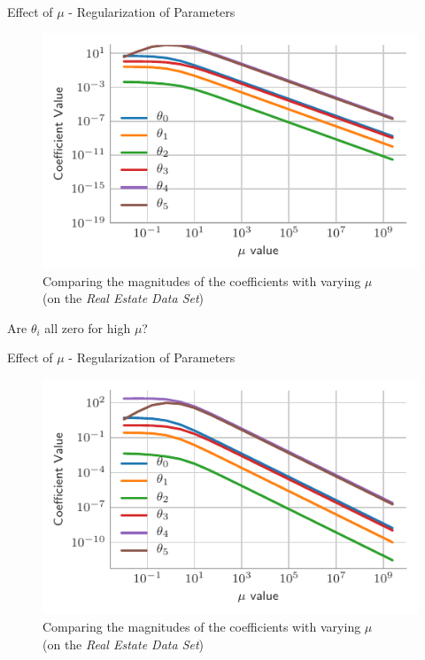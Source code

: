 \documentclass{beamer}
\begin{document}

\begin{frame}{Effect of $\mu$ - Regularization of Parameters}
\vspace{0.4cm}
\begin{figure}\includegraphics[width=0.8\linewidth]{../assets/ridge/figures/rid_reg-without-lim.pdf}\caption{Comparing the magnitudes of the coefficients with varying $\mu$\\(on the \emph{Real Estate Data Set})}
\end{figure}
\pause Are $\theta_{i}$ all zero for high $\mu$?
\end{frame}

\begin{frame}{Effect of $\mu$ - Regularization of Parameters}
\vspace{0.4cm}
\begin{figure}\includegraphics[width=0.8\linewidth]{../assets/ridge/figures/rid_reg-with-lim.pdf}\caption{Comparing the magnitudes of the coefficients with varying $\mu$\\(on the \emph{Real Estate Data Set})}
\end{figure}
\end{frame}
\end{document}
